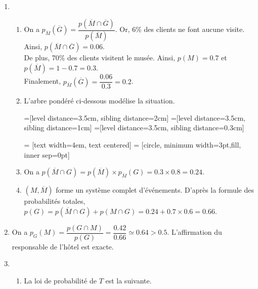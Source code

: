 \documentclass[11pt,fleqn, openany]{book} %
\begin{document}
\begin{solution}\hspace{0pt}

\begin{enumerate}\item \begin{enumerate}
\item On a $p_{\overline{M}}(\overline{G})=\dfrac{p(\overline{M} \cap \overline{G})}{p(\overline{M})}$. Or, 6\% des clients ne font aucune visite. Ainsi, $p(\overline{M} \cap \overline{G})=0.06$. \\De plus, 70\% des clients visitent le musée. Ainsi, $p(M)=0.7$ et $p(\overline{M})=1-0.7=0.3$. \\Finalement, $p_{\overline{M}}(\overline{G})=\dfrac{0.06}{0.3}=0.2$.
\item L'arbre pondéré ci-dessous modélise la
situation.

\begin{center}

=[level distance=3.5cm, sibling distance=2cm]
=[level distance=3.5cm, sibling distance=1cm]
=[level distance=3.5cm, sibling distance=0.3cm]

 = [text width=4em, text centered]
 = [circle, minimum width=3pt,fill, inner sep=0pt]

\end{center}

\item On a $p(\overline{M}\cap G)=p(\overline{M}) \times p_{\overline{M}}(G)=0.3 \times 0.8 = 0.24$. 
\item $(M,\overline{M})$ forme un système complet d'événements. D'après la formule des probabilités totales, $p(G)=p(\overline{M} \cap G)+p(M\cap G)=0.24+0.7 \times 0.6=0.66$. 
\end{enumerate}
\item On a $p_G(M)=\dfrac{p(G\cap M)}{p(G)}=\dfrac{0.42}{0.66}\simeq 0.64>0.5$. L'affirmation du responsable de l'hôtel est exacte.
\item 
\begin{enumerate}
\item La loi de probabilité de $T$ est la suivante.


\end{enumerate}
\end{enumerate}
\end{solution}
\end{document}
